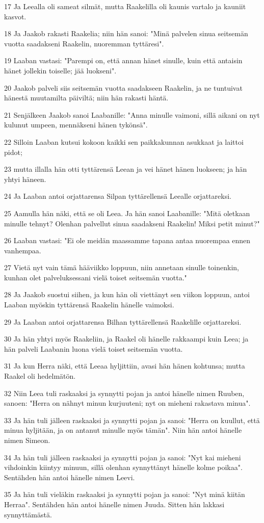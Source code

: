 \par 17 Ja Leealla oli sameat silmät, mutta Raakelilla oli kaunis vartalo ja kauniit kasvot.
\par 18 Ja Jaakob rakasti Raakelia; niin hän sanoi: "Minä palvelen sinua seitsemän vuotta saadakseni Raakelin, nuoremman tyttäresi".
\par 19 Laaban vastasi: "Parempi on, että annan hänet sinulle, kuin että antaisin hänet jollekin toiselle; jää luokseni".
\par 20 Jaakob palveli siis seitsemän vuotta saadakseen Raakelin, ja ne tuntuivat hänestä muutamilta päiviltä; niin hän rakasti häntä.
\par 21 Senjälkeen Jaakob sanoi Laabanille: "Anna minulle vaimoni, sillä aikani on nyt kulunut umpeen, mennäkseni hänen tykönsä".
\par 22 Silloin Laaban kutsui kokoon kaikki sen paikkakunnan asukkaat ja laittoi pidot;
\par 23 mutta illalla hän otti tyttärensä Leean ja vei hänet hänen luokseen; ja hän yhtyi häneen.
\par 24 Ja Laaban antoi orjattarensa Silpan tyttärellensä Leealle orjattareksi.
\par 25 Aamulla hän näki, että se oli Leea. Ja hän sanoi Laabanille: "Mitä oletkaan minulle tehnyt? Olenhan palvellut sinua saadakseni Raakelin! Miksi petit minut?"
\par 26 Laaban vastasi: "Ei ole meidän maassamme tapana antaa nuorempaa ennen vanhempaa.
\par 27 Vietä nyt vain tämä hääviikko loppuun, niin annetaan sinulle toinenkin, kunhan olet palveluksessani vielä toiset seitsemän vuotta."
\par 28 Ja Jaakob suostui siihen, ja kun hän oli viettänyt sen viikon loppuun, antoi Laaban myöskin tyttärensä Raakelin hänelle vaimoksi.
\par 29 Ja Laaban antoi orjattarensa Bilhan tyttärellensä Raakelille orjattareksi.
\par 30 Ja hän yhtyi myös Raakeliin, ja Raakel oli hänelle rakkaampi kuin Leea; ja hän palveli Laabanin luona vielä toiset seitsemän vuotta.
\par 31 Ja kun Herra näki, että Leeaa hyljittiin, avasi hän hänen kohtunsa; mutta Raakel oli hedelmätön.
\par 32 Niin Leea tuli raskaaksi ja synnytti pojan ja antoi hänelle nimen Ruuben, sanoen: "Herra on nähnyt minun kurjuuteni; nyt on mieheni rakastava minua".
\par 33 Ja hän tuli jälleen raskaaksi ja synnytti pojan ja sanoi: "Herra on kuullut, että minua hyljitään, ja on antanut minulle myös tämän". Niin hän antoi hänelle nimen Simeon.
\par 34 Ja hän tuli jälleen raskaaksi ja synnytti pojan ja sanoi: "Nyt kai mieheni vihdoinkin kiintyy minuun, sillä olenhan synnyttänyt hänelle kolme poikaa". Sentähden hän antoi hänelle nimen Leevi.
\par 35 Ja hän tuli vieläkin raskaaksi ja synnytti pojan ja sanoi: "Nyt minä kiitän Herraa". Sentähden hän antoi hänelle nimen Juuda. Sitten hän lakkasi synnyttämästä.

